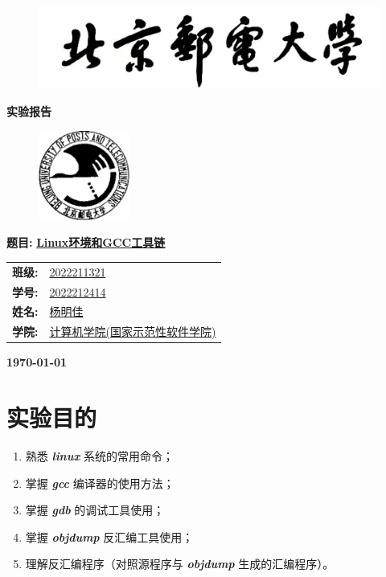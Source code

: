 \documentclass[UTF8, 12pt, a4paper, oneside]{ctexart}
\begin{document}
	\sloppy
	\thispagestyle{empty}
    \begin{figure}[t]
		\centering
		\includegraphics[width=13cm]{logo1.jpg}
	\end{figure}

    \begin{center}
        \Huge\textbf{实验报告}
    \end{center}
	\vspace*{1em}
    \begin{figure}[htbp]
		\centering
		\includegraphics[width=3cm]{logo2.jpg}
	\end{figure}
	\begin{center}
		\Huge\textbf{题目:} \underline{\textbf{Linux环境和GCC工具链}} 
	\end{center}
    \vspace*{5em}
	\begin{table}[htbp]
		\centering
		\large
		\begin{tabular}{ll}
        \textbf{班级:} & \underline{2022211321} \\
		\textbf{学号:} & \underline{2022212414} \\
		\textbf{姓名:} & \underline{杨明佳} \\
		\textbf{学院:} & \underline{计算机学院(国家示范性软件学院)} \\
		\end{tabular}
	\end{table}

    \vspace*{2em}

    \begin{center}
        \Huge\textbf{\today} 
    \end{center}

    \section{实验目的}
        \begin{enumerate}
            \item 熟悉 \textbf{\textit{linux}} 系统的常用命令；
            \item 掌握 \textbf{\textit{gcc}} 编译器的使用方法；
            \item 掌握 \textbf{\textit{gdb}} 的调试工具使用；
            \item 掌握 \textbf{\textit{objdump}} 反汇编工具使用；
            \item 理解反汇编程序（对照源程序与 \textbf{\textit{objdump}} 生成的汇编程序）。
        \end{enumerate}
\end{document}
